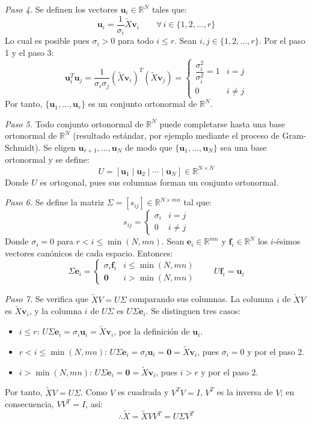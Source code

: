 \textit{Paso 4.} Se definen los vectores $\mathbf{u}_i \in \mathbb{R}^N$ tales que:
\[
\mathbf{u}_i = \frac{1}{\sigma_i}\tilde{X}\mathbf{v}_i
\qquad \forall \, i \in \{1, 2, \dots, r\}
\]
Lo cual es posible pues $\sigma_i > 0$ para todo $i \leq r$. Sean
$i, j \in \{1, 2, \dots, r\}$. Por el paso 1 y el paso 3:
\[
\mathbf{u}_i^T\mathbf{u}_j
= \frac{1}{\sigma_i\sigma_j}(\tilde{X}\mathbf{v}_i)^T(\tilde{X}\mathbf{v}_j)
= \begin{cases}
    \dfrac{\sigma_i^2}{\sigma_i^2} = 1 & i = j \\[2mm]
    0 & i \neq j
\end{cases}
\]
Por tanto, $\{\mathbf{u}_1, \dots, \mathbf{u}_r\}$ es un conjunto ortonormal
de $\mathbb{R}^N$.

\textit{Paso 5.} Todo conjunto ortonormal de $\mathbb{R}^N$ puede completarse
hasta una base ortonormal de $\mathbb{R}^N$ (resultado estándar, por ejemplo
mediante el proceso de Gram-Schmidt). Se eligen
$\mathbf{u}_{r+1}, \dots, \mathbf{u}_N$ de modo que
$\{\mathbf{u}_1, \dots, \mathbf{u}_N\}$ sea una base ortonormal y se define:
\[
U = [\mathbf{u}_1 \mid \mathbf{u}_2 \mid \cdots \mid \mathbf{u}_N]
\in \mathbb{R}^{N \times N}
\]
Donde $U$ es ortogonal, pues sus columnas forman un conjunto ortonormal.

\textit{Paso 6.} Se define la matriz $\Sigma = [s_{ij}] \in \mathbb{R}^{N \times mn}$
tal que:
\[
s_{ij} = \begin{cases}
    \sigma_i & i = j \\
    0 & i \neq j
\end{cases}
\]
Donde $\sigma_i = 0$ para $r < i \leq \min(N, mn)$. Sean
$\mathbf{e}_i \in \mathbb{R}^{mn}$ y $\mathbf{f}_i \in \mathbb{R}^N$ los
$i$-ésimos vectores canónicos de cada espacio. Entonces:
\[
\Sigma\mathbf{e}_i = \begin{cases}
    \sigma_i\mathbf{f}_i & i \leq \min(N, mn) \\
    \mathbf{0} & i > \min(N, mn)
\end{cases}
\qquad
U\mathbf{f}_i = \mathbf{u}_i
\]

\textit{Paso 7.} Se verifica que $\tilde{X}V = U\Sigma$ comparando sus
columnas. La columna $i$ de $\tilde{X}V$ es $\tilde{X}\mathbf{v}_i$, y la
columna $i$ de $U\Sigma$ es $U\Sigma\mathbf{e}_i$. Se distinguen tres casos:
\begin{itemize}
    \item $i \leq r$: $U\Sigma\mathbf{e}_i = \sigma_i\mathbf{u}_i
    = \tilde{X}\mathbf{v}_i$, por la definición de $\mathbf{u}_i$.
    \item $r < i \leq \min(N, mn)$: $U\Sigma\mathbf{e}_i
    = \sigma_i\mathbf{u}_i = \mathbf{0} = \tilde{X}\mathbf{v}_i$,
    pues $\sigma_i = 0$ y por el paso 2.
    \item $i > \min(N, mn)$: $U\Sigma\mathbf{e}_i = \mathbf{0}
    = \tilde{X}\mathbf{v}_i$, pues $i > r$ y por el paso 2.
\end{itemize}
Por tanto, $\tilde{X}V = U\Sigma$. Como $V$ es cuadrada y $V^TV = I$, $V^T$ es la
inversa de $V$; en consecuencia, $VV^T = I$, así:
\[
\therefore \tilde{X} = \tilde{X}VV^T = U\Sigma V^T
\]


